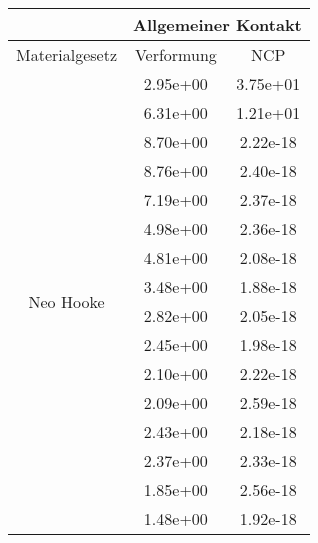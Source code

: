 \begin{table} 
\centering 
\begin{tabular}{c|cc|} 
\cline{2-3} 
 & \multicolumn{2}{|c|}{Allgemeiner Kontakt} \\ 
\hline 
\multicolumn{1}{|c|}{Materialgesetz} & \multicolumn{1}{c|}{Verformung} & \multicolumn{1}{c|}{NCP} \\ 
\hline 
\multicolumn{1}{|c|}{\multirow{32}{*}{Neo Hooke}} &\multicolumn{1}{|c|}{  2.95e+00} & \multicolumn{1}{|c|}{  3.75e+01} \\ 
\multicolumn{1}{|c|}{} & \multicolumn{1}{|c|}{  6.31e+00} & \multicolumn{1}{|c|}{  1.21e+01} \\ 
\multicolumn{1}{|c|}{} & \multicolumn{1}{|c|}{  8.70e+00} & \multicolumn{1}{|c|}{  2.22e-18} \\ 
\multicolumn{1}{|c|}{} & \multicolumn{1}{|c|}{  8.76e+00} & \multicolumn{1}{|c|}{  2.40e-18} \\ 
\multicolumn{1}{|c|}{} & \multicolumn{1}{|c|}{  7.19e+00} & \multicolumn{1}{|c|}{  2.37e-18} \\ 
\multicolumn{1}{|c|}{} & \multicolumn{1}{|c|}{  4.98e+00} & \multicolumn{1}{|c|}{  2.36e-18} \\ 
\multicolumn{1}{|c|}{} & \multicolumn{1}{|c|}{  4.81e+00} & \multicolumn{1}{|c|}{  2.08e-18} \\ 
\multicolumn{1}{|c|}{} & \multicolumn{1}{|c|}{  3.48e+00} & \multicolumn{1}{|c|}{  1.88e-18} \\ 
\multicolumn{1}{|c|}{} & \multicolumn{1}{|c|}{  2.82e+00} & \multicolumn{1}{|c|}{  2.05e-18} \\ 
\multicolumn{1}{|c|}{} & \multicolumn{1}{|c|}{  2.45e+00} & \multicolumn{1}{|c|}{  1.98e-18} \\ 
\multicolumn{1}{|c|}{} & \multicolumn{1}{|c|}{  2.10e+00} & \multicolumn{1}{|c|}{  2.22e-18} \\ 
\multicolumn{1}{|c|}{} & \multicolumn{1}{|c|}{  2.09e+00} & \multicolumn{1}{|c|}{  2.59e-18} \\ 
\multicolumn{1}{|c|}{} & \multicolumn{1}{|c|}{  2.43e+00} & \multicolumn{1}{|c|}{  2.18e-18} \\ 
\multicolumn{1}{|c|}{} & \multicolumn{1}{|c|}{  2.37e+00} & \multicolumn{1}{|c|}{  2.33e-18} \\ 
\multicolumn{1}{|c|}{} & \multicolumn{1}{|c|}{  1.85e+00} & \multicolumn{1}{|c|}{  2.56e-18} \\ 
\multicolumn{1}{|c|}{} & \multicolumn{1}{|c|}{  1.48e+00} & \multicolumn{1}{|c|}{  1.92e-18} \\ 

\end{tabular}
\end{table}
